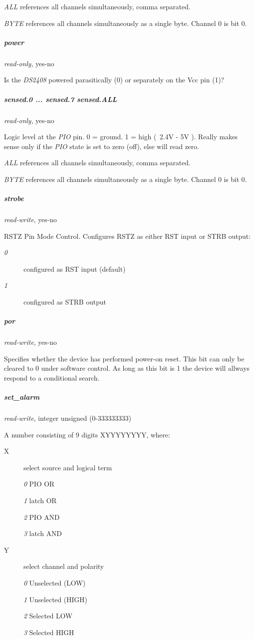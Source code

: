 \textit{ALL} references all channels simultaneously, comma separated. 

\textit{BYTE} references all channels simultaneously as a single byte. Channel 0
is bit 0. 
\subparagraph*{power}\textit{read-only,} yes-no 

Is the \textit{DS2408} powered parasitically (0) or separately on the Vcc \textsf{pin (1)}?

\subparagraph*{sensed.0 ... sensed.7 sensed.ALL}\textit{read-only,} yes-no 

Logic level at the \textit{PIO} pin. 0 = ground. 1 = high (~2.4V - 5V ). Really makes
sense only if the \textit{PIO} state is set to zero (off), else will read zero. 

\textit{ALL} references all channels simultaneously, comma separated. 

\textit{BYTE} references all channels simultaneously as a single byte. Channel 0
is bit 0. 
\subparagraph*{strobe}\textit{read-write,} yes-no 

RSTZ Pin Mode Control. Configures RSTZ as either RST input or STRB output:
\begin{description}
\item [\textit{0} ] configured as RST input (default) 
\item [\textit{1} ] configured as STRB output 
\end{description}



\subparagraph*{por}\textit{read-write,}
yes-no 

Specifies whether the device has performed power-on reset. This bit can only
be cleared to 0 under software control. As long as this bit is 1 the device
will allways respond to a conditional search. 
\subparagraph*{set\_alarm}\textit{read-write,} integer
unsigned (0-333333333) 

A number consisting of 9 digits XYYYYYYYY, where: \begin{description}
\item [X ] select source and logical
term  

\textit{0} PIO   OR  

\textit{1} latch OR  

\textit{2} PIO   AND  

\textit{3} latch AND 
\item [Y ] select channel and polarity 

\textit{0} Unselected (LOW)  

\textit{1} Unselected (HIGH)  

\textit{2} Selected    LOW  

\textit{3} Selected    HIGH 
\end{description}


